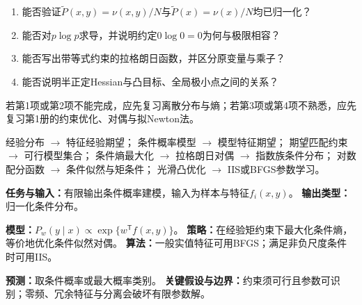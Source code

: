 \begin{precheckbox}
\begin{enumerate}[leftmargin=2.2em]
  \item 能否验证$\widetilde P(x,y)=\nu(x,y)/N$与$\widetilde P(x)=\nu(x)/N$均已归一化？
  \item 能否对$p\log p$求导，并说明约定$0\log0=0$为何与极限相容？
  \item 能否写出带等式约束的拉格朗日函数，并区分原变量与乘子？
  \item 能否说明半正定Hessian与凸目标、全局极小点之间的关系？
\end{enumerate}
若第1项或第2项不能完成，应先复习离散分布与熵；若第3项或第4项不熟悉，应先复习第1册的约束优化、对偶与拟Newton法。
\end{precheckbox}

\label{struct:V3-C01-CH04}
\begin{dependencybox}
经验分布 $\to$ 特征经验期望；
条件概率模型 $\to$ 模型特征期望；
期望匹配约束 $\to$ 可行模型集合；
条件熵最大化 $\to$ 拉格朗日对偶 $\to$ 指数族条件分布；
对数配分函数 $\to$ 条件似然与矩条件；
光滑凸优化 $\to$ IIS或BFGS参数学习。
\end{dependencybox}

\begin{keypointbox}[title=模型认识卡：最大熵模型]
\textbf{任务与输入：}有限输出条件概率建模，输入为样本与特征$f_i(x,y)$。\quad
\textbf{输出类型：}归一化条件分布。\par
\textbf{模型：}$P_w(y\mid x)\propto\exp\{w^{\mathsf T}f(x,y)\}$。\quad
\textbf{策略：}在经验矩约束下最大化条件熵，等价地优化条件似然对偶。\quad
\textbf{算法：}一般实值特征可用BFGS；满足非负尺度条件时可用IIS。\par
\textbf{预测：}取条件概率或最大概率类别。\quad
\textbf{关键假设与边界：}约束须可行且参数可识别；零频、冗余特征与分离会破坏有限参数解。
\end{keypointbox}

